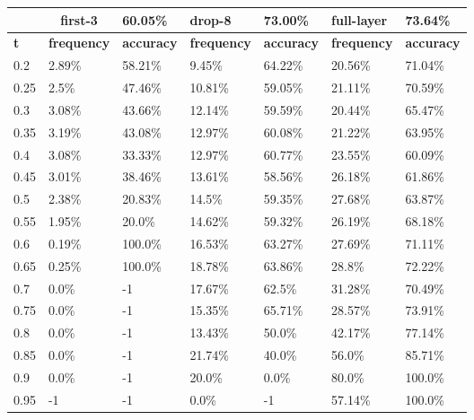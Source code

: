 
\begin{table}[t]
\centering
\begin{tabular}{lllllll}
\hline
\multicolumn{1}{c}{} & \multicolumn{1}{c}{first-3} & \multicolumn{1}{l|}{60.05\%} & drop-8 & \multicolumn{1}{l|}{73.00\%} & full-layer & 73.64\% \\ \hline
\multicolumn{1}{l|}{\textbf{t}} & \textbf{frequency} & \multicolumn{1}{l|}{\textbf{accuracy}} & \textbf{frequency} & \multicolumn{1}{l|}{\textbf{accuracy}} & \textbf{frequency} & \textbf{accuracy} \\ \hline	\multicolumn{1}{l|}{0.2}&  2.89\% & \multicolumn{1}{l|}{58.21\%}& 9.45\% & \multicolumn{1}{l|}{64.22\%}& 20.56\% & 71.04\%\\ 
\multicolumn{1}{l|}{0.25}&  2.5\% & \multicolumn{1}{l|}{47.46\%}& 10.81\% & \multicolumn{1}{l|}{59.05\%}& 21.11\% & 70.59\%\\ 
\multicolumn{1}{l|}{0.3}&  3.08\% & \multicolumn{1}{l|}{43.66\%}& 12.14\% & \multicolumn{1}{l|}{59.59\%}& 20.44\% & 65.47\%\\ 
\multicolumn{1}{l|}{0.35}&  3.19\% & \multicolumn{1}{l|}{43.08\%}& 12.97\% & \multicolumn{1}{l|}{60.08\%}& 21.22\% & 63.95\%\\ 
\multicolumn{1}{l|}{0.4}&  3.08\% & \multicolumn{1}{l|}{33.33\%}& 12.97\% & \multicolumn{1}{l|}{60.77\%}& 23.55\% & 60.09\%\\ 
\multicolumn{1}{l|}{0.45}&  3.01\% & \multicolumn{1}{l|}{38.46\%}& 13.61\% & \multicolumn{1}{l|}{58.56\%}& 26.18\% & 61.86\%\\ 
\multicolumn{1}{l|}{0.5}&  2.38\% & \multicolumn{1}{l|}{20.83\%}& 14.5\% & \multicolumn{1}{l|}{59.35\%}& 27.68\% & 63.87\%\\ 
\multicolumn{1}{l|}{0.55}&  1.95\% & \multicolumn{1}{l|}{20.0\%}& 14.62\% & \multicolumn{1}{l|}{59.32\%}& 26.19\% & 68.18\%\\ 
\multicolumn{1}{l|}{0.6}&  0.19\% & \multicolumn{1}{l|}{100.0\%}& 16.53\% & \multicolumn{1}{l|}{63.27\%}& 27.69\% & 71.11\%\\ 
\multicolumn{1}{l|}{0.65}&  0.25\% & \multicolumn{1}{l|}{100.0\%}& 18.78\% & \multicolumn{1}{l|}{63.86\%}& 28.8\% & 72.22\%\\ 
\multicolumn{1}{l|}{0.7}&  0.0\% & \multicolumn{1}{l|}{-1}& 17.67\% & \multicolumn{1}{l|}{62.5\%}& 31.28\% & 70.49\%\\ 
\multicolumn{1}{l|}{0.75}&  0.0\% & \multicolumn{1}{l|}{-1}& 15.35\% & \multicolumn{1}{l|}{65.71\%}& 28.57\% & 73.91\%\\ 
\multicolumn{1}{l|}{0.8}&  0.0\% & \multicolumn{1}{l|}{-1}& 13.43\% & \multicolumn{1}{l|}{50.0\%}& 42.17\% & 77.14\%\\ 
\multicolumn{1}{l|}{0.85}&  0.0\% & \multicolumn{1}{l|}{-1}& 21.74\% & \multicolumn{1}{l|}{40.0\%}& 56.0\% & 85.71\%\\ 
\multicolumn{1}{l|}{0.9}&  0.0\% & \multicolumn{1}{l|}{-1}& 20.0\% & \multicolumn{1}{l|}{0.0\%}& 80.0\% & 100.0\%\\ 
\multicolumn{1}{l|}{0.95}&  -1 & \multicolumn{1}{l|}{-1}& 0.0\% & \multicolumn{1}{l|}{-1}& 57.14\% & 100.0\%\\ 


\end{tabular}
\end{table}
